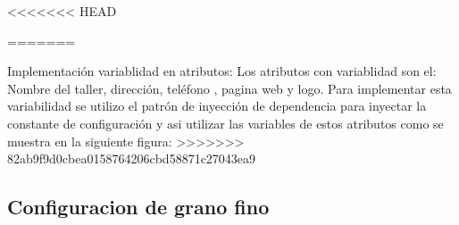 \documentclass[10pt,a4paper,openany]{book}
\begin{document}
\begin{enumerate}

<<<<<<< HEAD
\end{enumerate}
=======
\item Implementación variablidad en atributos: Los atributos con variablidad son el: Nombre del taller, dirección, teléfono , pagina web y logo. Para implementar esta variabilidad se utilizo el patrón de inyección de dependencia para inyectar la constante de configuración y asi utilizar las variables de estos atributos como se muestra en la siguiente figura:
>>>>>>> 82ab9f9d0cbea0158764206cbd58871c27043ea9



\subsection{Configuracion de grano fino}
\end{document}
